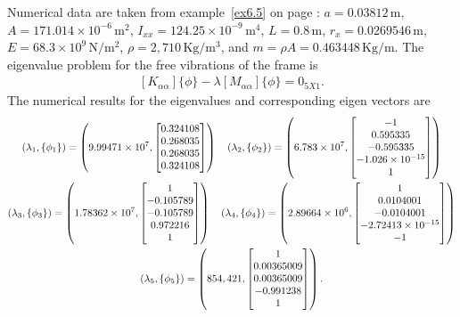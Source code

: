 \documentclass{AeroStructure-ERJohnson}
\begin{document}
\begin{example}
Numerical data are taken from example~\ref{ex6.5} on page \pageref{ex6.5}: $a=0.03812\,\mathrm{m}$, $A=171.014 \times 10^{-6}\,\mathrm{m}^{2}$, $I_{x x}=124.25 \times 10^{-9}\,\mathrm{m}^{4}$, $L=0.8\,\mathrm{m}$, $r_{x}=0.0269546\,\mathrm{m}$, $E=68.3 \times 10^{9}\,\mathrm{N}/\mathrm{m}^{2}$, $\rho=2{,}710\,\mathrm{Kg}/ \mathrm{m}^{3}$, and $m=\rho A=0.463448\,\mathrm{Kg}/\mathrm{m}$. The eigenvalue problem for the free vibrations of the frame is
\begin{align}\label{ex18.5i}
\left[K_{\alpha \alpha}\right]\{\phi\}-\lambda\left[M_{\alpha \alpha}\right]\{\phi\}=0_{5 X 1}.
\end{align}
The numerical results for the eigenvalues and corresponding eigen vectors are
\begin{gather}
\left(\lambda_{1},\left\{\phi_{1}\right\}\right)=\left(9.99471 \times 10^{7},\left[\begin{array}{@{}c@{}}0.324108 \\0.268035 \\0.268035 \\0.324108\end{array}\right]\right)
\quad\left(\lambda_{2},\left\{\phi_{2}\right\}\right)=\left(6.783 \times 10^{7},\left[\begin{array}{@{}c@{}}-1 \\0.595335 \\-0.595335 \\-1.026 \times 10^{-15} \\1\end{array}\right]\right)\label{ex18.5j}\\
\left(\lambda_{3},\left\{\phi_{3}\right\}\right)=\left(1.78362 \times 10^{7},\left[\begin{array}{@{}c@{}}1 \\ -0.105789 \\ -0.105789 \\ 0.972216\\
1\end{array}\right]\right)
\quad\left(\lambda_{4},\left\{\phi_{4}\right\}\right)=\left(2.89664 \times 10^{6},\left[\begin{array}{@{}c@{}}1 \\0.0104001 \\-0.0104001 \\-2.72413 \times 10^{-15} \\ -1\end{array}\right]\right)\label{ex18.5k}\\
\left(\lambda_{5},\left\{\phi_{5}\right\}\right)=\left(854,421,\left[\begin{array}{@{}c@{}}1 \\0.00365009 \\0.00365009 \\-0.991238 \\1\end{array}\right]\right).\label{ex18.5l}

\end{gather}
\end{example}
\end{document}
